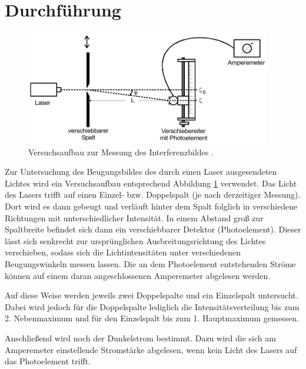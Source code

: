 \section{Durchführung}
\label{sec:Durchführung}
\begin{figure}[H]
  \centering
  \includegraphics[height=5cm]{Aufbau.PNG}
  \caption{Versuchsaufbau zur Messung des Interferenzbildes \cite{sample}.}
  \label{fig:aufbau}
\end{figure}

Zur Untersuchung des Beugungsbildes des durch einen Laser ausgesendeten Lichtes wird
ein Versuchsaufbau entsprechend Abbildung \ref{fig:aufbau} verwendet.
Das Licht des Lasers trifft auf einen Einzel- bzw. Doppelspalt (je nach derzeitiger Messung).
Dort wird es dann gebeugt und verläuft hinter dem Spalt folglich in verschiedene Richtungen mit
unterschiedlicher Intensität. In einem Abstand groß zur Spaltbreite befindet sich dann ein verschiebbarer
Detektor (Photoelement). Dieser lässt sich senkrecht zur ursprünglichen Ausbreitungsrichtung des Lichtes
verschieben, sodass sich die Lichtintensitäten unter verschiedenen Beugungswinkeln messen lassen. Die
an dem Photoelement entstehenden Ströme können auf einem daran angeschlossenen Amperemeter abgelesen werden.

Auf diese Weise werden jeweils zwei Doppelspalte und ein Einzelspalt untersucht. Dabei wird jedoch für die
Doppelspalte lediglich die Intensitätsverteilung bis zum 2. Nebenmaximum und für den Einzelspalt bis zum 1.
Hauptmaximum gemessen.

Anschließend wird noch der Dunkelstrom bestimmt. Dazu wird die sich am Amperemeter einstellende Stromstärke
abgelesen, wenn kein Licht des Lasers auf das Photoelement trifft.
